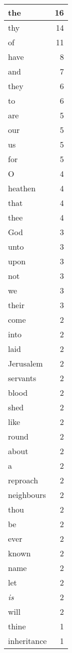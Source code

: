 \begin{center}
\begin{longtable}{l|r}
\hline \hline
\endlastfoot
the & 16 \\ \hline
thy & 14 \\ \hline
of & 11 \\ \hline
have & 8 \\ \hline
and & 7 \\ \hline
they & 6 \\ \hline
to & 6 \\ \hline
are & 5 \\ \hline
our & 5 \\ \hline
us & 5 \\ \hline
for & 5 \\ \hline
O & 4 \\ \hline
heathen & 4 \\ \hline
that & 4 \\ \hline
thee & 4 \\ \hline
God & 3 \\ \hline
unto & 3 \\ \hline
upon & 3 \\ \hline
not & 3 \\ \hline
we & 3 \\ \hline
their & 3 \\ \hline
come & 2 \\ \hline
into & 2 \\ \hline
laid & 2 \\ \hline
Jerusalem & 2 \\ \hline
servants & 2 \\ \hline
blood & 2 \\ \hline
shed & 2 \\ \hline
like & 2 \\ \hline
round & 2 \\ \hline
about & 2 \\ \hline
a & 2 \\ \hline
reproach & 2 \\ \hline
neighbours & 2 \\ \hline
thou & 2 \\ \hline
be & 2 \\ \hline
ever & 2 \\ \hline
known & 2 \\ \hline
name & 2 \\ \hline
let & 2 \\ \hline
\emph{is} & 2 \\ \hline
will & 2 \\ \hline
thine & 1 \\ \hline
inheritance & 1 \\ \hline

\end{longtable}
\end{center}
